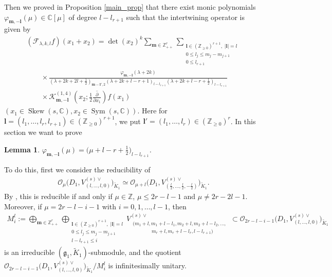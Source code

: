 \documentclass[pdftex]{sigma}
\numberwithin{equation}{section}
\newtheorem{Lemma}[Theorem]{Lemma}
\newcommand{\bl}{\mathbf{l}}
\newcommand{\bm}{\mathbf{m}}
\newcommand{\BZ}{\mathbb{Z}}
\newcommand{\BC}{\mathbb{C}}
\newcommand{\fg}{\mathfrak{g}}
\newcommand{\cF}{\mathcal{F}}
\newcommand{\cK}{\mathcal{K}}
\newcommand{\cO}{\mathcal{O}}
\newcommand{\Sym}{\operatorname{Sym}}
\newcommand{\Skew}{\operatorname{Skew}}
\begin{document}
Then we proved in Proposition \ref{main_prop} that there exist monic polynomials $\varphi_{\bm,-\bl}(\mu)\in\BC[\mu]$ of degree
$l-l_{r+1}$ such that the intertwining operator is given by
\begin{gather*}
 (\cF_{\lambda,k,l}f)(x_1+x_2)=\det(x_2)^k\sum_{\bm\in\BZ_{++}^r}
\sum_{\substack{\bl\in(\BZ_{\ge 0})^{r+1},\; |\bl|=l\\ 0\le l_j\le m_j-m_{j+1}\\ 0\le l_{r+1}}}\\
 \qquad{}\times\frac{\varphi_{\bm,-\bl}(\lambda+2k)}{\left(\lambda+2k+2l+\frac{1}{2}\right)_{\bm-\bl',2}
\left(\lambda+2k+l-r+1\right)_{l-l_{r+1}}\left(\lambda+2k+l-r+\frac{1}{2}\right)_{l-l_{r+1}}} \\
\qquad{} \times\cK_{\bm,-\bl}^{(1,4)}\left(x_2;\frac{1}{2}\overline{\frac{\partial}{\partial x_1}}\right)f(x_1)
\end{gather*}
$(x_1\in\Skew(s,\BC), x_2\in\Sym(s,\BC))$. Here for $\bl=(l_1,\ldots,l_r,l_{r+1})\in(\BZ_{\ge 0})^{r+1}$, we put $\bl'=(l_1,\ldots,l_r)\in(\BZ_{\ge 0})^r$. In this section we want to prove
\begin{Lemma}\label{remaining_eq}
$\varphi_{\bm,-\bl}(\mu)=\big(\mu+l-r+\tfrac{1}{2}\big)_{l-l_{r+1}}$.
\end{Lemma}
To do this, first we consider the reducibility of
\begin{gather*} \cO_\mu\big(D_1,V_{(l,\ldots,l,0)}^{(s)\vee}\big)_{\tilde{K}_1}\simeq
\cO_{\mu+l}\big(D_1,V_{\left(\frac{l}{2},\ldots,\frac{l}{2},-\frac{l}{2}\right)}^{(s)\vee}\big)_{\tilde{K}_1}. \end{gather*}
By \cite[Theorem 6.2(6)]{N2}, this is reducible if and only if $\mu\in\BZ$, $\mu\le 2r-l-1$ and $\mu\ne 2r-2l-1$.
Moreover, if $\mu=2r-l-i-1$ with $i=0,1,\ldots,l-1$, then
\begin{gather*} M_i^l:=\bigoplus_{\bm\in\BZ_{++}^r}
\bigoplus_{\substack{\bl\in(\BZ_{\ge 0})^{r+1},\; |\bl|=l\\ 0\le l_j\le m_j-m_{j+1}\\ l-l_{r+1}\le i}}
V_{\substack{(m_1+l,m_1+l-l_1,m_2+l,m_2+l-l_2,\ldots,\;\\
\hspace{45pt}m_r+l,m_r+l-l_r,l-l_{r+1})}}^{(s)\vee} \subset \cO_{2r-l-i-1}\big(D_1,V_{(l,\dots,l,0)}^{(s)\vee}\big)_{\tilde{K}_1} \end{gather*}
is an irreducible $(\fg_1,\tilde{K}_1)$-submodule, and the quotient $\cO_{2r-l-i-1}\big(D_1,V_{(l,\dots,l,0)}^{(s)\vee}\big)_{\tilde{K}_1}/M_i^l$ is infinitesimally unitary.
\end{document}
